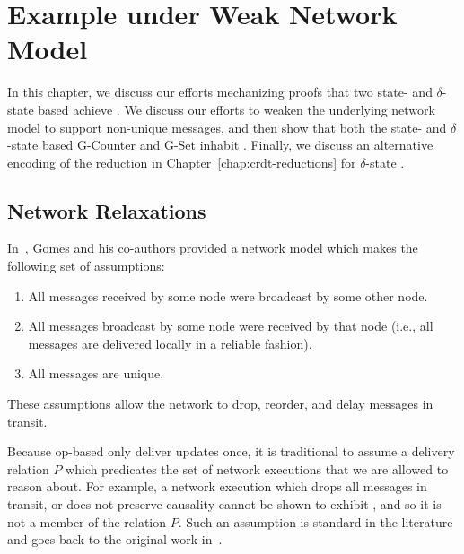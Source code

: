 \chapter{Example \CRDTs under Weak Network Model}
\label{chap:example-crdts}

In this chapter, we discuss our efforts mechanizing proofs that two state- and
$\delta$-state based \CRDTs achieve \SEC.  We discuss our efforts to weaken the
underlying network model to support non-unique messages, and then show that both
the state- and $\delta$-state based G-Counter and G-Set inhabit \SEC. Finally,
we discuss an alternative encoding of the reduction in
Chapter~\ref{chap:crdt-reductions} for $\delta$-state \CRDTs.

\section{Network Relaxations}
\label{sec:network-relaxations}
In~\citep{gomes17}, Gomes and his co-authors provided a network model which
makes the following set of assumptions:
\begin{enumerate}
  \item All messages received by some node were broadcast by some other node.
  \item All messages broadcast by some node were received by that node (i.e.,
    all messages are delivered locally in a reliable fashion).
  \item All messages are unique.
\end{enumerate}
These assumptions allow the network to drop, reorder, and delay messages in
transit.

Because op-based \CRDTs only deliver updates once, it is traditional to assume a
delivery relation $P$ which predicates the set of network executions that we are
allowed to reason about. For example, a network execution which drops all
messages in transit, or does not preserve causality cannot be shown to exhibit
\SEC, and so it is not a member of the relation $P$.  Such an assumption is
standard in the literature and goes back to the original work
in~\citep{shapiro11}.

